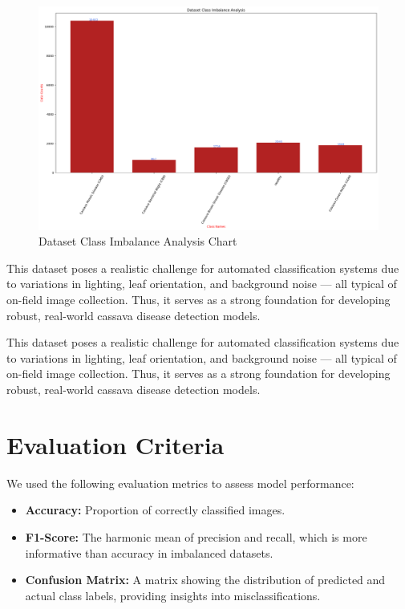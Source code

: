 \begin{figure}[H]
  \centering
  \includegraphics[width=0.7\linewidth]{figures/data_chart.png}
  \caption{Dataset Class Imbalance Analysis Chart}
  \label{fig:cmd}
\end{figure}


This dataset poses a realistic challenge for automated classification systems due to variations in lighting, leaf orientation, and background noise — all typical of on-field image collection. Thus, it serves as a strong foundation for developing robust, real-world cassava disease detection models.



This dataset poses a realistic challenge for automated classification systems due to variations in lighting, leaf orientation, and background noise — all typical of on-field image collection. Thus, it serves as a strong foundation for developing robust, real-world cassava disease detection models.

\section{Evaluation Criteria}
We used the following evaluation metrics to assess model performance:
\begin{itemize}
  \item \textbf{Accuracy:} Proportion of correctly classified images.
  \item \textbf{F1-Score:} The harmonic mean of precision and recall, which is more informative than accuracy in imbalanced datasets.
  \item \textbf{Confusion Matrix:} A matrix showing the distribution of predicted and actual class labels, providing insights into misclassifications.
\end{itemize}

